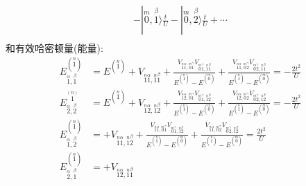 \documentclass[../../main.tex]{subfiles}
\begin{document}
\begin{enumerate}
\begin{align*}
        - |\stackrel{m}{0},\stackrel{\beta}{1}\rangle\frac{t}{U}
        - |\stackrel{m}{0},\stackrel{\beta}{2}\rangle\frac{t}{U} + \cdots\\
    \end{align*}
    和有效哈密顿量(能量):
    \begin{align*}
        E^{(\stackrel{n}{1})}_{\stackrel{\alpha}{1},\stackrel{\beta}{1}} &= E^{(\stackrel{n}{1})} 
        + V_{\stackrel{n}{1}\stackrel{\alpha}{1},\stackrel{n}{1}\stackrel{\beta}{1}}
        + \frac{
            V_{\stackrel{n}{1}\stackrel{\alpha}{1},\stackrel{m}{0}\stackrel{\gamma}{1}}
            V_{\stackrel{m}{0}\stackrel{\gamma}{1},\stackrel{n}{1}\stackrel{\beta}{1}}}{E^{(\stackrel{n}{1})}-E^{(\stackrel{m}{0})}}
        + \frac{
            V_{\stackrel{n}{1}\stackrel{\alpha}{1},\stackrel{m}{0}\stackrel{\gamma}{2}}
            V_{\stackrel{m}{0}\stackrel{\gamma}{2},\stackrel{n}{1}\stackrel{\beta}{1}}}{E^{(\stackrel{n}{1})}-E^{(\stackrel{m}{0})}}
        = -\frac{2t^{2}}{U}\\
        E^{\stackrel{(n)}{1}}_{\stackrel{\alpha}{2},\stackrel{\beta}{2}} &= E^{(\stackrel{n}{1})}
        + V_{\stackrel{n}{1}\stackrel{\alpha}{2},\stackrel{n}{1}\stackrel{\beta}{2}}
        + \frac{
            V_{\stackrel{n}{1}\stackrel{\alpha}{2},\stackrel{m}{0}\stackrel{\gamma}{1}}
            V_{\stackrel{m}{0}\stackrel{\gamma}{1},\stackrel{n}{1}\stackrel{\beta}{2}}}{E^{(\stackrel{n}{1})}-E^{(\stackrel{m}{0})}}
        + \frac{
            V_{\stackrel{n}{1}\stackrel{\alpha}{2},\stackrel{m}{0}\stackrel{\gamma}{2}}
            V_{\stackrel{m}{0}\stackrel{\gamma}{2},\stackrel{n}{1}\stackrel{\beta}{2}}}{E^{(\stackrel{n}{1})}-E^{(\stackrel{m}{0})}}
        = -\frac{2t^{2}}{U}\\
        E^{(\stackrel{n}{1})}_{\stackrel{\alpha}{1},\stackrel{\beta}{2}} &= 
        + V_{\stackrel{n}{1}\stackrel{\alpha}{1},\stackrel{n}{1}\stackrel{\beta}{2}}
        + \frac{
            V_{\stackrel{n}{1}\stackrel{\alpha}{1},\stackrel{m}{0}\stackrel{\gamma}{1}}
            V_{\stackrel{m}{0}\stackrel{\gamma}{1},\stackrel{n}{1}\stackrel{\beta}{2}}}{E^{(\stackrel{n}{1})}-E^{(\stackrel{m}{0})}}
        + \frac{
            V_{\stackrel{n}{1}\stackrel{\alpha}{1},\stackrel{m}{0}\stackrel{\gamma}{2}}
            V_{\stackrel{m}{0}\stackrel{\gamma}{2},\stackrel{n}{1}\stackrel{\beta}{2}}}{E^{(\stackrel{n}{1})}-E^{(\stackrel{m}{0})}}
        = \frac{2t^{2}}{U}\\
        E^{(\stackrel{n}{1})}_{\stackrel{\alpha}{2},\stackrel{\beta}{1}} &= 
        + V_{\stackrel{n}{1}\stackrel{\alpha}{2},\stackrel{n}{1}\stackrel{\beta}{1}}

\end{align*}
\end{enumerate}
\end{document}
